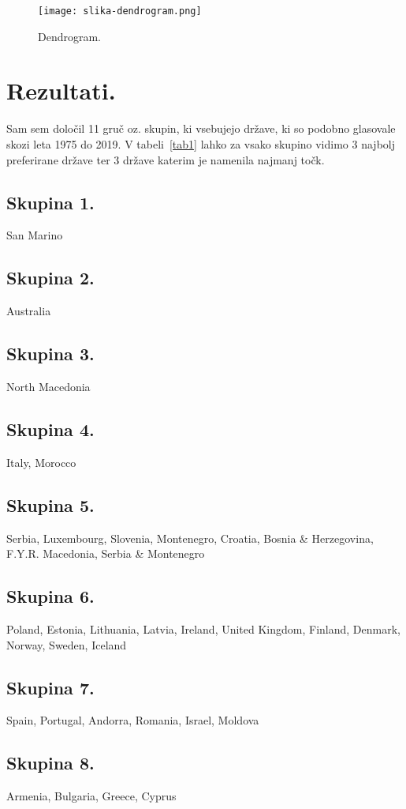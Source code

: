\documentclass[a4paper,11pt]{article}
\begin{document}
\begin{figure}[htbp]
\begin{center}
    \texttt{[image: slika-dendrogram.png]}
    \caption{Dendrogram.}
\label{slika1}
\end{center}
\end{figure}

\newpage
\section{Rezultati.}

Sam sem določil 11 gruč oz. skupin, ki vsebujejo države, ki so podobno glasovale skozi leta 1975 do 2019. V tabeli~\ref{tab1} lahko za vsako skupino vidimo 3 najbolj preferirane države ter 3 države katerim je namenila najmanj točk.

\subsection{Skupina 1.}
San Marino
\subsection{Skupina 2.}
Australia
\subsection{Skupina 3.}
North Macedonia
\subsection{Skupina 4.}
Italy, Morocco
\subsection{Skupina 5.}
Serbia, Luxembourg, Slovenia, Montenegro, Croatia, Bosnia & Herzegovina, F.Y.R. Macedonia, Serbia \& Montenegro
\subsection{Skupina 6.}
Poland, Estonia, Lithuania, Latvia, Ireland, United Kingdom, Finland, Denmark, Norway, Sweden, Iceland
\subsection{Skupina 7.}
Spain, Portugal, Andorra, Romania, Israel, Moldova
\subsection{Skupina 8.}
Armenia, Bulgaria, Greece, Cyprus
\end{document}
